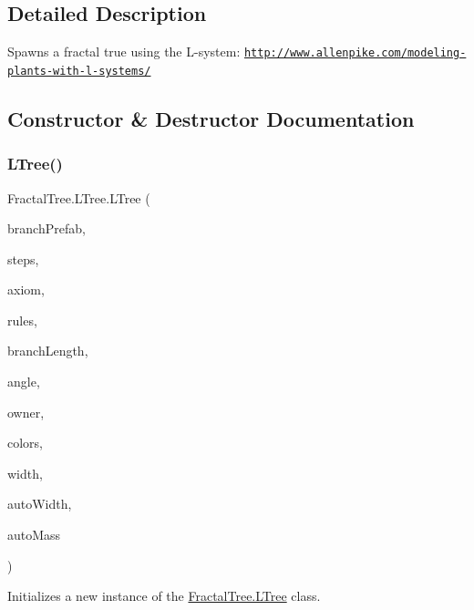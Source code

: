 \subsection{Detailed Description}
Spawns a fractal true using the L-\/system\+: \href{http://www.allenpike.com/modeling-plants-with-l-systems/}{\tt http\+://www.\+allenpike.\+com/modeling-\/plants-\/with-\/l-\/systems/} 



\subsection{Constructor \& Destructor Documentation}
\mbox{\label{class_fractal_tree_1_1_l_tree_aac93139ff0e0b365ca88c2ff38ae1595}} 
\subsubsection{\texorpdfstring{L\+Tree()}{LTree()}}
{\footnotesize\ttfamily Fractal\+Tree.\+L\+Tree.\+L\+Tree (\begin{DoxyParamCaption}\item[{Game\+Object}]{branch\+Prefab,  }\item[{int}]{steps,  }\item[{string}]{axiom,  }\item[{\hyperlink{class_fractal_tree_1_1_l_rule}{L\+Rule} \mbox{[}$\,$\mbox{]}}]{rules,  }\item[{float}]{branch\+Length,  }\item[{float}]{angle,  }\item[{Transform}]{owner,  }\item[{Color \mbox{[}$\,$\mbox{]}}]{colors,  }\item[{float}]{width,  }\item[{bool}]{auto\+Width,  }\item[{bool}]{auto\+Mass }\end{DoxyParamCaption})}



Initializes a new instance of the \hyperlink{class_fractal_tree_1_1_l_tree}{Fractal\+Tree.\+L\+Tree} class. 


